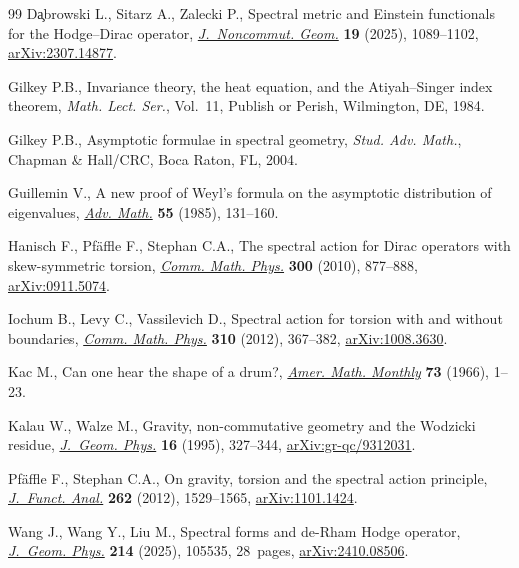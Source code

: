 \documentclass[10pt,a4paper]{amsart}
\numberwithin{equation}{section}
\theoremstyle{definition}
\let\MFOriginalCedilla\c
\renewcommand{\c}[1]{{\MFcedillafont\MFOriginalCedilla{#1}}}
\begin{document}
\begin{thebibliography}{99}
D\c{a}browski L., Sitarz A., Zalecki P., Spectral metric and {E}instein
 functionals for the {H}odge--{D}irac operator,
 \href{https://doi.org/10.4171/jncg/573}{\textit{J.~Noncommut. Geom.}}
 \textbf{19} (2025), 1089--1102,
 \href{http://arxiv.org/abs/2307.14877}{arXiv:2307.14877}.

Gilkey P.B., Invariance theory, the heat equation, and the {A}tiyah--{S}inger
 index theorem, \textit{Math. Lect. Ser.}, Vol.~11, Publish or Perish,
 Wilmington, DE, 1984.

Gilkey P.B., Asymptotic formulae in spectral geometry, \textit{Stud. Adv. Math.},
 Chapman \& Hall/CRC, Boca Raton, FL, 2004.

Guillemin V., A new proof of {W}eyl's formula on the asymptotic distribution of
 eigenvalues, \href{https://doi.org/10.1016/0001-8708(85)90018-0}{\textit{Adv.
 Math.}} \textbf{55} (1985), 131--160.

Hanisch F., Pf\"affle F., Stephan C.A., The spectral action for {D}irac
 operators with skew-symmetric torsion,
 \href{https://doi.org/10.1007/s00220-010-1135-3}{\textit{Comm. Math. Phys.}}
 \textbf{300} (2010), 877--888,
 \href{http://arxiv.org/abs/0911.5074}{arXiv:0911.5074}.

Iochum B., Levy C., Vassilevich D., Spectral action for torsion with and
 without boundaries,
 \href{https://doi.org/10.1007/s00220-011-1406-7}{\textit{Comm. Math. Phys.}}
 \textbf{310} (2012), 367--382,
 \href{http://arxiv.org/abs/1008.3630}{arXiv:1008.3630}.

Kac M., Can one hear the shape of a drum?,
 \href{https://doi.org/10.2307/2313748}{\textit{Amer. Math. Monthly}}
 \textbf{73} (1966), 1--23.

Kalau W., Walze M., Gravity, non-commutative geometry and the {W}odzicki
 residue, \href{https://doi.org/10.1016/0393-0440(94)00032-Y}{\textit{J.~Geom.
 Phys.}} \textbf{16} (1995), 327--344,
 \href{http://arxiv.org/abs/gr-qc/9312031}{arXiv:gr-qc/9312031}.

Pf\"affle F., Stephan C.A., On gravity, torsion and the spectral action
 principle, \href{https://doi.org/10.1016/j.jfa.2011.11.013}{\textit{J.~Funct.
 Anal.}} \textbf{262} (2012), 1529--1565,
 \href{http://arxiv.org/abs/1101.1424}{arXiv:1101.1424}.

Wang J., Wang Y., Liu M., Spectral forms and de-{R}ham {H}odge operator,
 \href{https://doi.org/10.1016/j.geomphys.2025.105535}{\textit{J.~Geom.
 Phys.}} \textbf{214} (2025), 105535, 28~pages,
 \href{http://arxiv.org/abs/2410.08506}{arXiv:2410.08506}.


\end{thebibliography}
\end{document}
